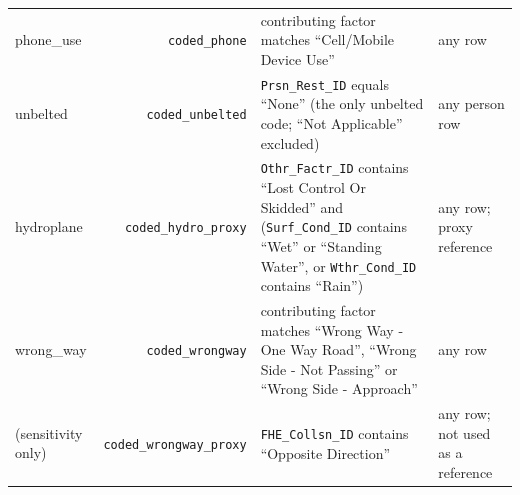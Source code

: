\begin{small}
\begin{longtable}{>{\raggedright\arraybackslash}p{73.0pt}r>{\raggedright\arraybackslash}p{203.7pt}>{\raggedright\arraybackslash}p{70.6pt}}
phone\_use & \texttt{coded\_phone} & contributing factor matches ``Cell/Mobile Device Use'' & any row \\
unbelted & \texttt{coded\_unbelted} & \texttt{Prsn\_Rest\_ID} equals ``None'' (the only unbelted code; ``Not Applicable'' excluded) & any person row \\
hydroplane & \texttt{coded\_hydro\_proxy} & \texttt{Othr\_Factr\_ID} contains ``Lost Control Or Skidded'' and (\texttt{Surf\_Cond\_ID} contains ``Wet'' or ``Standing Water'', or \texttt{Wthr\_Cond\_ID} contains ``Rain'') & any row; proxy reference \\
wrong\_way & \texttt{coded\_wrongway} & contributing factor matches ``Wrong Way - One Way Road'', ``Wrong Side - Not Passing'' or ``Wrong Side - Approach'' & any row \\
(sensitivity only) & \texttt{coded\_wrongway\_proxy} & \texttt{FHE\_Collsn\_ID} contains ``Opposite Direction'' & any row; not used as a reference \\
\end{longtable}
\end{small}
